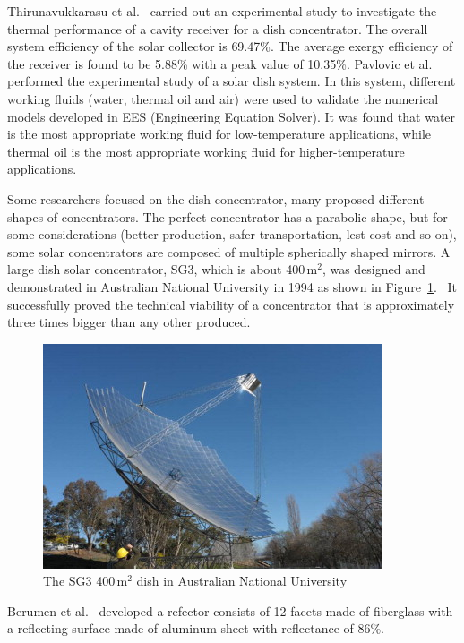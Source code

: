 Thirunavukkarasu et al.~\cite{Thirunavukkarasu2017} carried out an experimental study to investigate the thermal performance of a cavity receiver for a dish concentrator. The overall system efficiency of the solar collector is 69.47\%. The average exergy efficiency of the receiver is found to be 5.88\% with a peak value of 10.35\%.
Pavlovic et al.~\cite{Pavlovic2017} performed the experimental study of a solar dish system. In this system, different working fluids (water, thermal oil and air) were used to validate the numerical models developed in EES (Engineering Equation Solver). It was found that water is the most appropriate working fluid for low-temperature applications, while thermal oil is the most appropriate working fluid for higher-temperature applications.

Some researchers focused on the dish concentrator, many proposed different shapes of concentrators. The perfect concentrator has a parabolic shape, but for some considerations (better production, safer transportation, lest cost and so on), some solar concentrators are composed of multiple spherically shaped mirrors.
A large dish solar concentrator, SG3, which is about 400$\,\mathrm{m^2}$, was designed and demonstrated in Australian National University in 1994 as shown in Figure~\ref{fig:LargeDish}.~\cite{Lovegrove2011} It successfully proved the technical viability of a concentrator that is approximately three times bigger than any other produced. 
\begin{figure}[!ht]
\centering
\includegraphics[width=.8\textwidth]{fig/largeDish.jpg}
\caption{The SG3 400$\,\mathrm{m^2}$ dish in Australian National University}\label{fig:LargeDish}
\end{figure}
Berumen et al.~\cite{Berumen2004} developed a refector consists of 12 facets made of fiberglass with a reflecting surface made of aluminum sheet with reflectance of 86\%.

